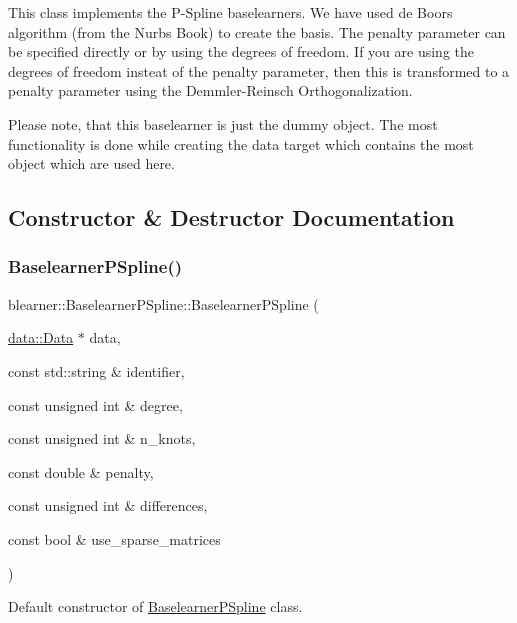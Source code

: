 This class implements the P-\/\+Spline baselearners. We have used de Boors algorithm (from the Nurbs Book) to create the basis. The penalty parameter can be specified directly or by using the degrees of freedom. If you are using the degrees of freedom insteat of the penalty parameter, then this is transformed to a penalty parameter using the Demmler-\/\+Reinsch Orthogonalization.

Please note, that this baselearner is just the dummy object. The most functionality is done while creating the data target which contains the most object which are used here. 

\subsection{Constructor \& Destructor Documentation}
\mbox{\label{classblearner_1_1_baselearner_p_spline_af891e692907a085213491c584305fbde}} 
\subsubsection{\texorpdfstring{Baselearner\+P\+Spline()}{BaselearnerPSpline()}}
{\footnotesize\ttfamily blearner\+::\+Baselearner\+P\+Spline\+::\+Baselearner\+P\+Spline (\begin{DoxyParamCaption}\item[{\mbox{\hyperlink{classdata_1_1_data}{data\+::\+Data}} $\ast$}]{data,  }\item[{const std\+::string \&}]{identifier,  }\item[{const unsigned int \&}]{degree,  }\item[{const unsigned int \&}]{n\+\_\+knots,  }\item[{const double \&}]{penalty,  }\item[{const unsigned int \&}]{differences,  }\item[{const bool \&}]{use\+\_\+sparse\+\_\+matrices }\end{DoxyParamCaption})}



Default constructor of {\ttfamily \mbox{\hyperlink{classblearner_1_1_baselearner_p_spline}{Baselearner\+P\+Spline}}} class. 

